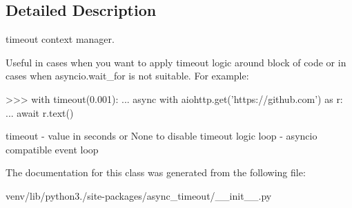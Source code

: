 \subsection{Detailed Description}
\begin{DoxyVerb}timeout context manager.

Useful in cases when you want to apply timeout logic around block
of code or in cases when asyncio.wait_for is not suitable. For example:

>>> with timeout(0.001):
...     async with aiohttp.get('https://github.com') as r:
...         await r.text()


timeout - value in seconds or None to disable timeout logic
loop - asyncio compatible event loop
\end{DoxyVerb}
 

The documentation for this class was generated from the following file\+:\begin{DoxyCompactItemize}
\item 
venv/lib/python3./site-\/packages/async\+\_\+timeout/\+\_\+\+\_\+init\+\_\+\+\_\+.\+py\end{DoxyCompactItemize}
